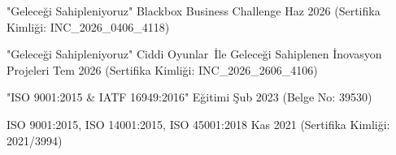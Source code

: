 
\vspace{-3mm}

\begin{cventries}

  \cventry
    {"Geleceği Sahipleniyoruz" Blackbox Business Challenge\texttrademark} %
    {} %
    {} %
    {Haz 2026} %
    {\scriptsize\color{lighttext}(Sertifika Kimliği: INC\_2026\_0406\_4118)}

  \cventry
    {"Geleceği Sahipleniyoruz" Ciddi Oyunlar\texttrademark\ İle Geleceği Sahiplenen İnovasyon Projeleri} %
    {} %
    {} %
    {Tem 2026} %
    {\scriptsize\color{lighttext}(Sertifika Kimliği: INC\_2026\_2606\_4106)}

\end{cventries}

\vspace{-3mm}

\begin{cventries}

  \cventry
    {"ISO 9001:2015 \& IATF 16949:2016" Eğitimi} %
    {} %
    {} %
    {Şub 2023} %
    {\scriptsize\color{lighttext}(Belge No: 39530)}

\end{cventries}

\vspace{-3mm}

\begin{cventries}

  \cventry
    {ISO 9001:2015, ISO 14001:2015, ISO 45001:2018} %
    {} %
    {} %
    {Kas 2021} %
    {\scriptsize\color{lighttext}(Sertifika Kimliği: 2021/3994)}

\end{cventries}

